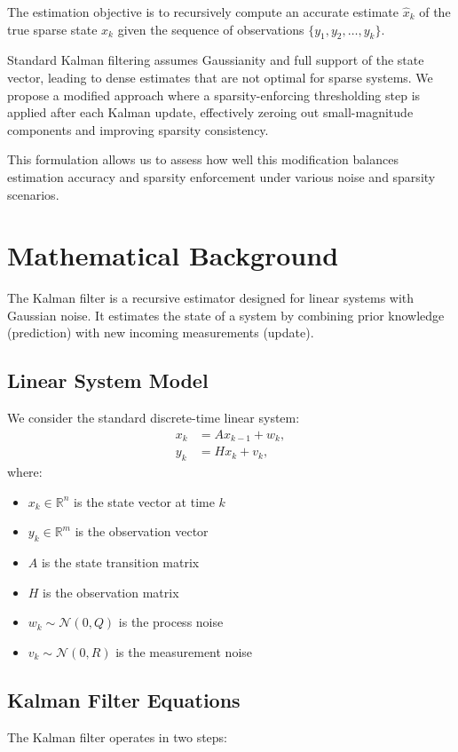 \documentclass[12pt]{article}
\begin{document}
The estimation objective is to recursively compute an accurate estimate $\hat{x}_k$ of the true sparse state $x_k$ given the sequence of observations $\{y_1, y_2, \dots, y_k\}$.

Standard Kalman filtering assumes Gaussianity and full support of the state vector, leading to dense estimates that are not optimal for sparse systems. We propose a modified approach where a sparsity-enforcing thresholding step is applied after each Kalman update, effectively zeroing out small-magnitude components and improving sparsity consistency.

This formulation allows us to assess how well this modification balances estimation accuracy and sparsity enforcement under various noise and sparsity scenarios.

\section{Mathematical Background}
The Kalman filter is a recursive estimator designed for linear systems with Gaussian noise. It estimates the state of a system by combining prior knowledge (prediction) with new incoming measurements (update).

\subsection{Linear System Model}
We consider the standard discrete-time linear system:
\begin{align}
    x_k &= A x_{k-1} + w_k, \\
    y_k &= H x_k + v_k,
\end{align}
where:
\begin{itemize}
    \item $x_k \in \mathbb{R}^n$ is the state vector at time $k$
    \item $y_k \in \mathbb{R}^m$ is the observation vector
    \item $A$ is the state transition matrix
    \item $H$ is the observation matrix
    \item $w_k \sim \mathcal{N}(0, Q)$ is the process noise
    \item $v_k \sim \mathcal{N}(0, R)$ is the measurement noise
\end{itemize}

\subsection{Kalman Filter Equations}
The Kalman filter operates in two steps:
\end{document}
